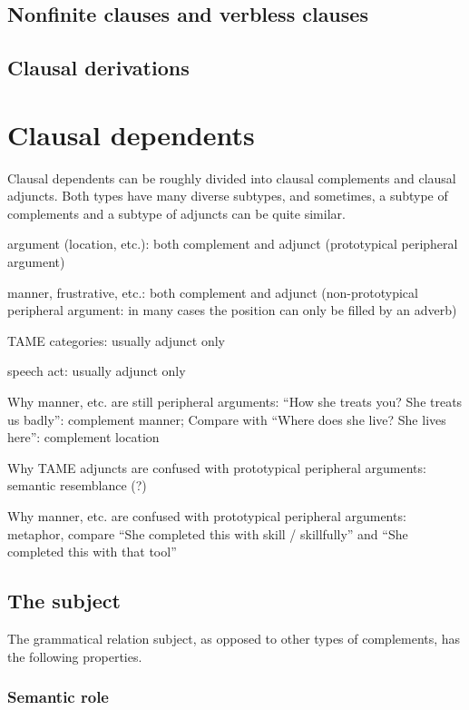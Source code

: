 \documentclass[UTF8, a4paper, oneside, scheme=plain]{ctexrep}
\begin{document}
\subsection{Nonfinite clauses and verbless clauses}\label{sec:simple-clause.nonfinite-clause}

\subsection{Clausal derivations}\label{sec:simple-clause.derivation}

\section{Clausal dependents}\label{sec:simple-clause.dependents}

Clausal dependents can be roughly divided into clausal complements and clausal adjuncts.
Both types have many diverse subtypes,
and sometimes, 
a subtype of complements and a subtype of adjuncts can be quite similar.

argument (location, etc.): both complement and adjunct (prototypical peripheral argument)

manner, frustrative, etc.: both complement and adjunct (non-prototypical peripheral argument: in many cases the position can only be filled by an adverb)

TAME categories: usually adjunct only 

speech act: usually adjunct only 

Why manner, etc. are still peripheral arguments: ``How she treats you? She treats us badly'': complement manner; 
Compare with ``Where does she live? She lives here'': complement location

Why TAME adjuncts are confused with prototypical peripheral arguments: semantic resemblance (?)

Why manner, etc. are confused with prototypical peripheral arguments:
metaphor, compare ``She completed this with skill / skillfully'' and ``She completed this with that tool''

\subsection{The subject}\label{sec:simple-clause.subject}

The grammatical relation subject, as opposed to other types of complements, 
has the following properties.

\subsubsection{Semantic role}
\end{document}
